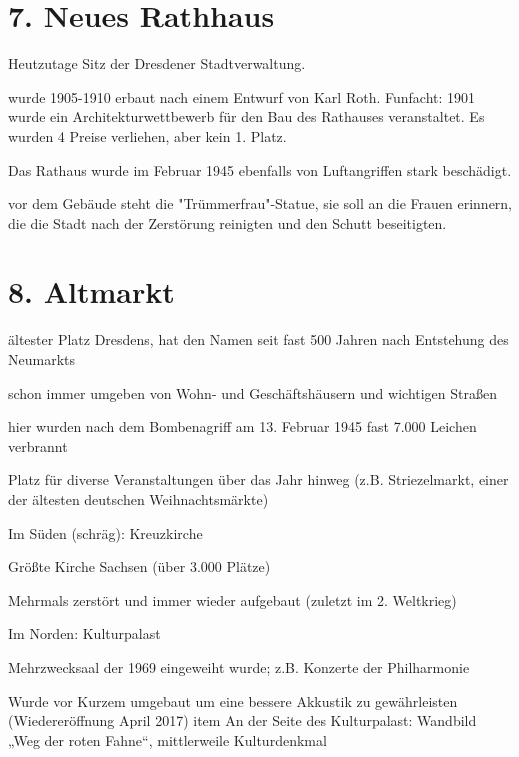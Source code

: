 \documentclass[a4paper,12pt]{report}
\begin{document}
\section{7. Neues Rathhaus}
\begin{itemize*}
	\item Heutzutage Sitz der Dresdener Stadtverwaltung.
	\item wurde 1905-1910 erbaut nach einem Entwurf von Karl Roth. Funfacht: 1901 wurde ein Architekturwettbewerb für den Bau des Rathauses veranstaltet. Es wurden 4 Preise verliehen, aber kein 1. Platz.
	\item Das Rathaus wurde im Februar 1945 ebenfalls von Luftangriffen stark beschädigt.
	\item vor dem Gebäude steht die "Trümmerfrau"-Statue, sie soll an die Frauen erinnern, die die Stadt nach der Zerstörung reinigten und den Schutt beseitigten.
\end{itemize*}

\section{8. Altmarkt}
\begin{itemize*}
\item ältester Platz Dresdens, hat den Namen seit fast 500 Jahren nach Entstehung des Neumarkts
\item schon immer umgeben von Wohn- und Geschäftshäusern und wichtigen Straßen
\item hier wurden nach dem Bombenagriff am 13. Februar 1945 fast 7.000 Leichen verbrannt
\item Platz für diverse Veranstaltungen über das Jahr hinweg (z.B. Striezelmarkt, einer der ältesten deutschen Weihnachtsmärkte)
\item Im Süden (schräg): Kreuzkirche
    \begin{itemize*}
    \item Größte Kirche Sachsen (über 3.000 Plätze)
    \item Mehrmals zerstört und immer wieder aufgebaut (zuletzt im 2. Weltkrieg)
    \end{itemize*}
\item Im Norden: Kulturpalast
    \begin{itemize*}
    \item Mehrzwecksaal der 1969 eingeweiht wurde; z.B. Konzerte der Philharmonie
    \item Wurde vor Kurzem umgebaut um eine bessere Akkustik zu gewährleisten (Wiedereröffnung April 2017)
    item An der Seite des Kulturpalast: Wandbild „Weg der roten Fahne“, mittlerweile Kulturdenkmal
    \end{itemize*}
\end{itemize*}
\end{document}
